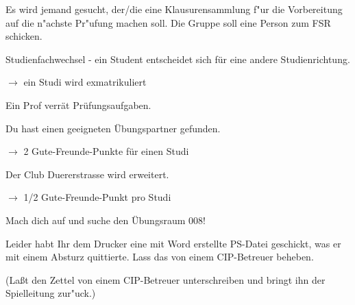 \documentclass[a4paper,12pt]{article}
\begin{document}

    Es wird jemand gesucht, der/die eine Klausurensammlung f"ur die 
    Vorbereitung auf die n"achste Pr"ufung machen soll.
    Die Gruppe soll eine Person zum FSR schicken.

    \vspace{10mm}



    Studienfachwechsel - ein Student entscheidet sich f\"ur eine
    andere Studienrichtung.

    $\rightarrow$ ein Studi wird exmatrikuliert
    \vspace{10mm}



    Ein Prof verr\"at Pr\"ufungsaufgaben.
    \vspace{10mm}



    Du hast einen geeigneten \"Ubungspartner gefunden.

    $\rightarrow$ 2 Gute-Freunde-Punkte f\"ur einen Studi
    \vspace{10mm}



    Der Club Duererstrasse wird erweitert.

    $\rightarrow$ 1/2 Gute-Freunde-Punkt pro Studi
    \vspace{10mm}



    Mach dich auf und suche den \"Ubungsraum 008!
    \vspace{10mm}



    Leider habt Ihr dem Drucker eine mit Word erstellte PS-Datei
    geschickt, was er mit einem Absturz quittierte. Lass das von einem
    CIP-Betreuer beheben.

    (La{\ss}t den Zettel von einem CIP-Betreuer unterschreiben und bringt
    ihn der Spielleitung zur"uck.)
    \vspace{10mm}


\end{document}

